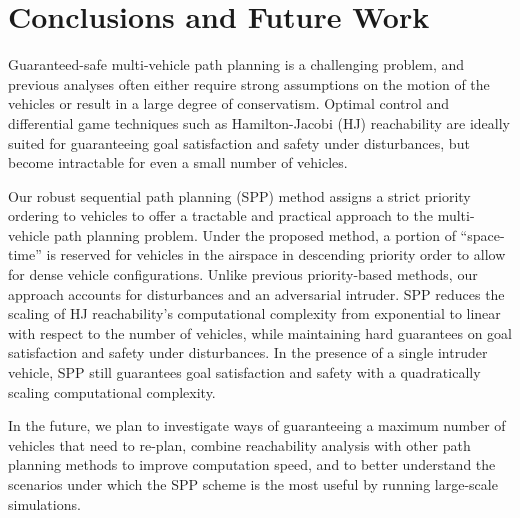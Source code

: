 \section{Conclusions and Future Work}
Guaranteed-safe multi-vehicle path planning is a challenging problem, and previous analyses often either require strong assumptions on the motion of the vehicles or result in a large degree of conservatism. Optimal control and differential game techniques such as Hamilton-Jacobi (HJ) reachability are ideally suited for guaranteeing goal satisfaction and safety under disturbances, but become intractable for even a small number of vehicles.

Our robust sequential path planning (SPP) method assigns a strict priority ordering to vehicles to offer a tractable and practical approach to the multi-vehicle path planning problem. Under the proposed method, a portion of ``space-time'' is reserved for vehicles in the airspace in descending priority order to allow for dense vehicle configurations. Unlike previous priority-based methods, our approach accounts for disturbances and an adversarial intruder. SPP reduces the scaling of HJ reachability's computational complexity from exponential to linear with respect to the number of vehicles, while maintaining hard guarantees on goal satisfaction and safety under disturbances. In the presence of a single intruder vehicle, SPP still guarantees goal satisfaction and safety with a quadratically scaling computational complexity.

In the future, we plan to investigate ways of guaranteeing a maximum number of vehicles that need to re-plan, combine reachability analysis with other path planning methods to improve computation speed, and to better understand the scenarios under which the SPP scheme is the most useful by running large-scale simulations.
